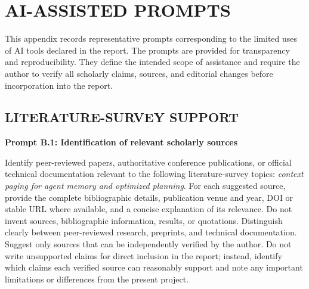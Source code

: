 \chapter{\texorpdfstring{\uppercase{AI-Assisted Prompts}}{AI-Assisted Prompts}}
\label{app:ai-prompts}

\newsavebox{\aipromptbox}
\newenvironment{aiprompt}
 {\par\medskip\noindent\begin{center}\begin{lrbox}{\aipromptbox}\begin{minipage}{0.94\textwidth}\sffamily\normalsize\setlength{\parindent}{0pt}\setlength{\parskip}{0.45em}}
{\end{minipage}\end{lrbox}\setlength{\fboxsep}{6pt}\fbox{\usebox{\aipromptbox}}\end{center}\medskip}

This appendix records representative prompts corresponding to the limited uses of
AI tools declared in the report. The prompts are provided for transparency and
reproducibility. They define the intended scope of assistance and require the
author to verify all scholarly claims, sources, and editorial changes before
incorporation into the report.

\section{\texorpdfstring{\uppercase{Literature-Survey Support}}{Literature-Survey Support}}

\noindent\textbf{Prompt B.1: Identification of relevant scholarly sources}

\begin{aiprompt}
Identify peer-reviewed papers, authoritative conference publications, or
official technical documentation relevant to the following literature-survey
topics: \textit{context paging for agent memory and optimized planning}. For each suggested source,
provide the complete bibliographic details, publication venue and year, DOI or
stable URL where available, and a concise explanation of its relevance. Do not
invent sources, bibliographic information, results, or quotations. Distinguish
clearly between peer-reviewed research, preprints, and technical documentation.
Suggest only sources that can be independently verified by the author. Do not
write unsupported claims for direct inclusion in the report; instead, identify
which claims each verified source can reasonably support and note any important
limitations or differences from the present project.
\end{aiprompt}


